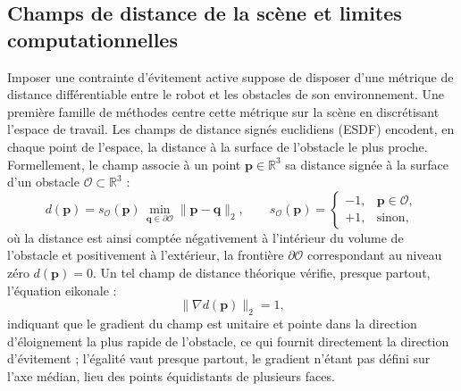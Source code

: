 \subsection{Champs de distance de la scène et limites computationnelles}
Imposer une contrainte d'évitement active suppose de disposer d'une métrique de distance différentiable entre le robot et les obstacles de son environnement. Une première famille de méthodes centre cette métrique sur la scène en discrétisant l'espace de travail. Les champs de distance signés euclidiens (\ac{ESDF}) encodent, en chaque point de l'espace, la distance à la surface de l'obstacle le plus proche. Formellement, le champ associe à un point $\mathbf{p} \in \mathbb{R}^3$ sa distance signée à la surface d'un obstacle $\mathcal{O}\subset\mathbb{R}^3$ :
\begin{equation}
d(\mathbf{p}) = s_{\mathcal{O}}(\mathbf{p})\,\min_{\mathbf{q}\in\partial\mathcal{O}}\|\mathbf{p}-\mathbf{q}\|_2,
\qquad
s_{\mathcal{O}}(\mathbf{p}) =
\begin{cases}
-1, & \mathbf{p} \in \mathcal{O},\\
+1, & \text{sinon},
\end{cases}
\end{equation}
où la distance est ainsi comptée négativement à l'intérieur du volume de l'obstacle et positivement à l'extérieur, la frontière $\partial\mathcal{O}$ correspondant au niveau zéro $d(\mathbf{p})=0$. Un tel champ de distance théorique vérifie, presque partout, l'équation eikonale :
\begin{equation}
\label{eq:eikonal}
\|\nabla d(\mathbf{p})\|_2 = 1,
\end{equation}
indiquant que le gradient du champ est unitaire et pointe dans la direction d'éloignement la plus rapide de l'obstacle, ce qui fournit directement la direction d'évitement ; l'égalité vaut presque partout, le gradient n'étant pas défini sur l'axe médian, lieu des points équidistants de plusieurs faces.

